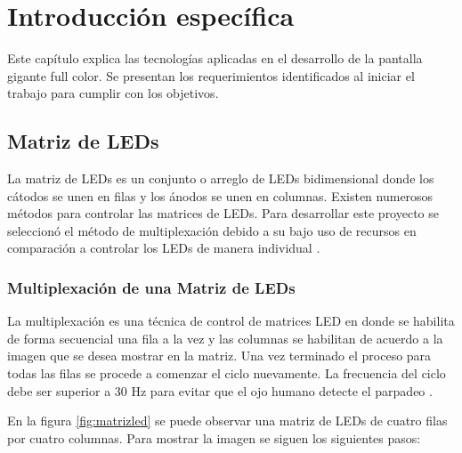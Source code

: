 \chapter{Introducción específica} %

\label{Chapter2}

Este capítulo explica las tecnologías aplicadas en el desarrollo de la pantalla gigante full color. Se presentan los requerimientos identificados al iniciar el trabajo para cumplir con los objetivos.
\section{Matriz de LEDs}
La matriz de LEDs es un conjunto o arreglo de LEDs  bidimensional donde los cátodos se unen en filas y los ánodos se unen en columnas. Existen numerosos métodos para controlar las matrices de LEDs. Para desarrollar este proyecto se seleccionó el método de multiplexación debido a su bajo uso de recursos en comparación a controlar los LEDs de manera individual \citep{CONCEPTOMATRIZ}.
\subsection{Multiplexación de una Matriz de LEDs }
La multiplexación es una técnica de control de matrices LED en donde se habilita de forma secuencial una fila a la vez y las columnas se habilitan de acuerdo a la imagen que se desea mostrar en la matriz. Una vez terminado el proceso para todas las filas se procede a comenzar el ciclo nuevamente. La frecuencia del ciclo debe ser superior a 30 Hz para evitar que el ojo humano detecte el parpadeo \citep{MULTIPLEXADO}.

En la figura \ref{fig:matrizled} se puede observar una matriz de LEDs de cuatro filas por cuatro columnas. Para mostrar la imagen se siguen los siguientes pasos:

